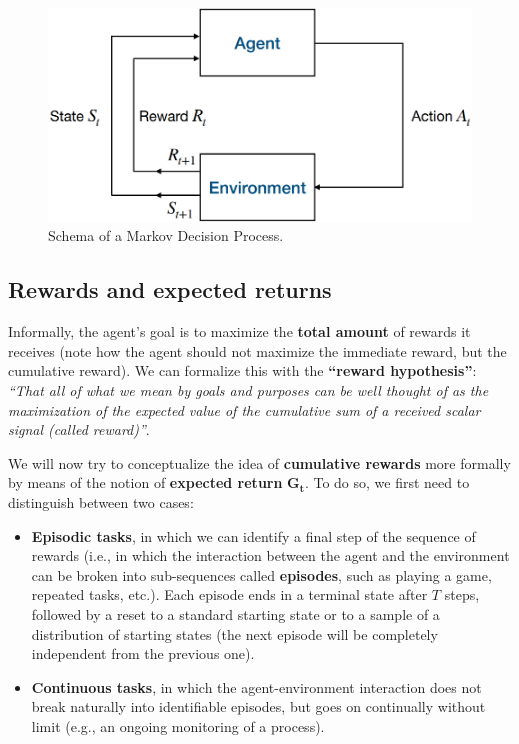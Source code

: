 \begin{figure}[hbt]
    \centering
    \includegraphics[width=\textwidth]{Images/Chapter 2/mdp.png}
    \caption{Schema of a Markov Decision Process.}
    \label{fig:ch2-mdp}
\end{figure}

\subsection{Rewards and expected returns}
Informally, the agent’s goal is to maximize the \textbf{total amount} of rewards it receives (note how the agent should not maximize the immediate reward, but the cumulative reward). We can formalize this with the \textbf{``reward hypothesis''}: \textit{``That all of what we mean by goals and purposes can be well thought of as the maximization of the expected value of the cumulative sum of a received scalar signal (called reward)''}.

We will now try to conceptualize the idea of \textbf{cumulative rewards} more formally by means of the notion of \textbf{expected return} $\boldsymbol{G_t}$. To do so, we first need to distinguish between two cases:
\begin{itemize}
    \item \textbf{Episodic tasks}, in which we can identify a final step of the sequence of rewards (i.e., in which the interaction between the agent and the environment can be broken into sub-sequences called \textbf{episodes}, such as playing a game, repeated tasks, etc.). Each episode ends in a terminal state after $T$ steps, followed by a reset to a standard starting state or to a sample of a distribution of starting states (the next episode will be completely independent from the previous one).
    \item \textbf{Continuous tasks}, in which the agent-environment interaction does not break naturally into identifiable episodes, but goes on continually without limit (e.g., an ongoing monitoring of a process).
\end{itemize}

